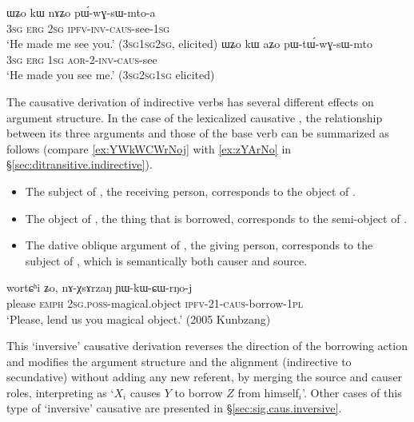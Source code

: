 \begin{exe}
	\ex 
	\begin{xlist}
		\ex \label{ex:WZo.kW.pWwGsWmtoa}
		\gll ɯʑo kɯ nɤʑo pɯ́-wɣ-sɯ-mto-a \\
		\textsc{3sg} \textsc{erg} \textsc{2sg} \textsc{ipfv}-\textsc{inv}-\textsc{caus}-see-\textsc{1sg} \\
		\glt `He made me see you.' (3\textsc{sg}\fl{}1\textsc{sg}\fl{}2\textsc{sg}, elicited)
		\ex \label{ex:WZo.kW.pWtWwGsWmto}
		\gll ɯʑo kɯ aʑo pɯ-tɯ́-wɣ-sɯ-mto \\
		\textsc{3sg} \textsc{erg} \textsc{1sg} \textsc{aor}-2-\textsc{inv}-\textsc{caus}-see \\
		\glt `He made you see me.'  (3\textsc{sg}\fl{}2\textsc{sg}\fl{}1\textsc{sg} elicited)
	\end{xlist}
\end{exe}

The causative derivation of indirective verbs has several different effects on argument structure. In the case of the lexicalized causative , the relationship between its three arguments and those of the base verb  can be summarized as follows (compare \ref{ex:YWkWCWrNoj} with \ref{ex:zYArNo} in §\ref{sec:ditransitive.indirective}).

\begin{itemize}
	\item The subject of , the receiving person, corresponds to the object of .
	\item The object of , the thing that is borrowed, corresponds to the semi-object of .
	\item The dative oblique argument of , the giving person, corresponds to the subject of , which is semantically both causer and source.
\end{itemize}


\begin{exe}
	\ex \label{ex:YWkWCWrNoj}
	\gll  wortɕʰi ʑo, nɤ-χsɤrzaŋ ɲɯ-kɯ-ɕɯ-rŋo-j \\
	please \textsc{emph} \textsc{2sg}.\textsc{poss}-magical.object \textsc{ipfv}-2\fl{}1-\textsc{caus}-borrow-\textsc{1pl} \\
	\glt `Please, lend us you magical object.' (2005 Kunbzang)
\end{exe}

This `inversive' causative derivation reverses the direction of the borrowing action and modifies the argument structure and the alignment (indirective to secundative) without adding any new referent, by merging the source and causer roles, interpreting  as `$X_i$ causes $Y$ to borrow $Z$ from himself$_i$'. Other cases of this type of `inversive' causative are presented in §\ref{sec:sig.caus.inversive}.

